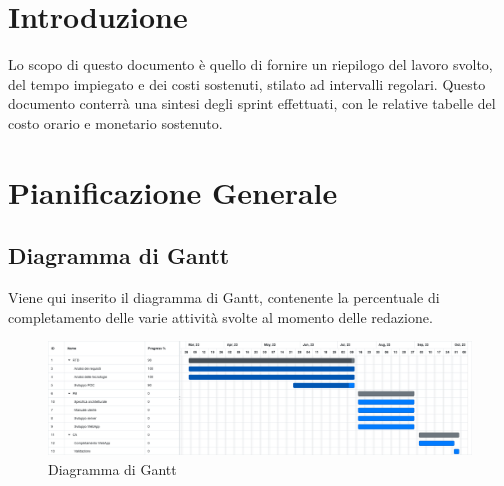 \documentclass[12pt]{article}
\begin{document}
\section{Introduzione}
Lo scopo di questo documento è quello di fornire un riepilogo del lavoro svolto, del tempo impiegato e dei costi sostenuti, stilato ad intervalli regolari.
Questo documento conterrà una sintesi degli sprint effettuati, con le relative tabelle del costo orario e monetario sostenuto.

\section{Pianificazione Generale}
\subsection{Diagramma di Gantt}
Viene qui inserito il diagramma di Gantt, contenente la percentuale di completamento delle varie attività svolte al momento delle redazione.

\begin{figure}
	\centering
	\includegraphics[width=1\textwidth]{img/Gantt.png}
	\caption{Diagramma di Gantt}
\end{figure}
\end{document}
